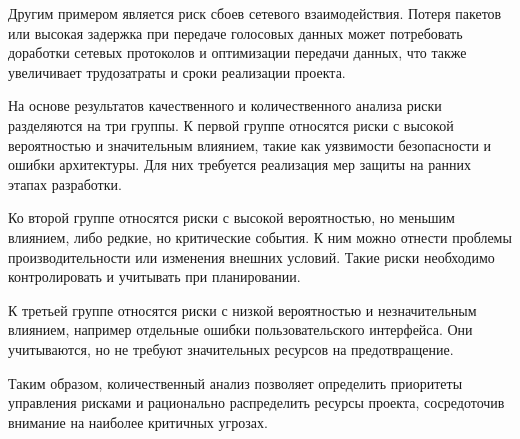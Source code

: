 \documentclass[14pt,a4paper]{extarticle}
\begin{document}
Другим примером является риск сбоев сетевого взаимодействия. Потеря пакетов или высокая задержка при передаче голосовых данных может потребовать доработки сетевых протоколов и оптимизации передачи данных, что также увеличивает трудозатраты и сроки реализации проекта.

На основе результатов качественного и количественного анализа риски разделяются на три группы. К первой группе относятся риски с высокой вероятностью и значительным влиянием, такие как уязвимости безопасности и ошибки архитектуры. Для них требуется реализация мер защиты на ранних этапах разработки.

Ко второй группе относятся риски с высокой вероятностью, но меньшим влиянием, либо редкие, но критические события. К ним можно отнести проблемы производительности или изменения внешних условий. Такие риски необходимо контролировать и учитывать при планировании.

К третьей группе относятся риски с низкой вероятностью и незначительным влиянием, например отдельные ошибки пользовательского интерфейса. Они учитываются, но не требуют значительных ресурсов на предотвращение.

Таким образом, количественный анализ позволяет определить приоритеты управления рисками и рационально распределить ресурсы проекта, сосредоточив внимание на наиболее критичных угрозах.
\end{document}
